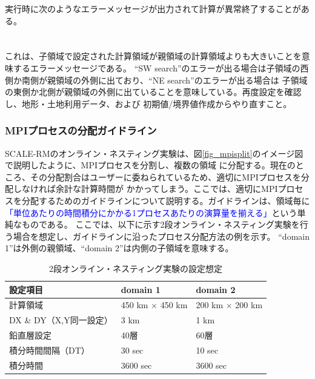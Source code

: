 実行時に次のようなエラーメッセージが出力されて計算が異常終了することがある。\\

\\

\\

\noindent これは、子領域で設定された計算領域が親領域の計算領域よりも大きいことを意味するエラーメッセージである。
``SW search''のエラーが出る場合は子領域の西側か南側が親領域の外側に出ており、``NE search''のエラーが出る場合は
子領域の東側か北側が親領域の外側に出ていることを意味している。再度設定を確認し、地形・土地利用データ、および
初期値/境界値作成からやり直すこと。


\subsubsection{MPIプロセスの分配ガイドライン}
SCALE-RMのオンライン・ネスティング実験は、図\ref{fig_mpisplit}のイメージ図で説明したように、MPIプロセスを分割し、複数の領域
に分配する。現在のところ、その分配割合はユーザーに委ねられているため、適切にMPIプロセスを分配しなければ余計な計算時間が
かかってしまう。ここでは、適切にMPIプロセスを分配するためのガイドラインについて説明する。ガイドラインは、領域毎に
\textcolor{blue}{「単位あたりの時間積分にかかる1プロセスあたりの演算量を揃える」}という単純なものである。
ここでは、以下に示す2段オンライン・ネスティング実験を行う場合を想定し、ガイドラインに沿ったプロセス分配方法の例を示す。
``domain 1''は外側の親領域、``domain 2''は内側の子領域を意味する。

\begin{table}[htb]
\begin{center}
\caption{2段オンライン・ネスティング実験の設定想定}
\begin{tabularx}{150mm}{|l|l|X|} \hline
 \rowcolor[gray]{0.9} 設定項目 & domain 1 & domain 2 \\ \hline
 計算領域 & 450 km $\times$ 450 km & 200 km $\times$ 200 km \\ \hline
 DX \& DY（X,Y同一設定） & 3 km & 1 km \\ \hline
 鉛直層設定 & 40層 & 60層 \\ \hline
 積分時間間隔（DT）& 30 sec & 10 sec \\ \hline
 積分時間 & 3600 sec & 3600 sec \\ \hline
\end{tabularx}
\label{tab:nest_proc_guide1}
\end{center}
\end{table}

